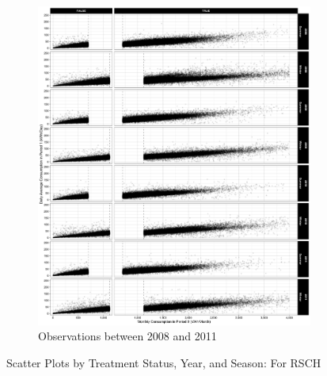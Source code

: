 \begin{figure}
\begin{subfigure}{1.0\textwidth}
        \includegraphics[scale = 0.12]{02_Plots/SMUD-Billing-Data_RD-Design_Scatter_Absolute-Consumption-in-H-Axis_RSCH_2008-2011}
        \caption{Observations between 2008 and 2011}
    \end{subfigure}
    \caption{Scatter Plots by Treatment Status, Year, and Season: For RSCH}
    \label{Figure:Scatter-Plots_RSCH}
\end{figure}

